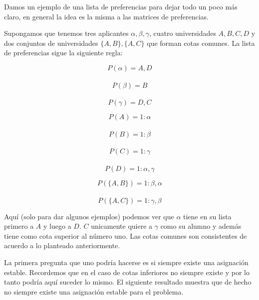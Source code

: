 Damos un ejemplo de una lista de preferencias para dejar todo un poco más claro, en general la idea es la misma a las matrices de preferencias.


\begin{eje} \cite{Todo}
\label{listprefeje}
Supongamos que tenemos tres aplicantes $\alpha,\beta, \gamma$, cuatro universidades $A,B,C,D$ y dos conjuntos de universidades $\{A,B\},\{A,C\}$ que forman cotas comunes. La lista de preferencias sigue la siguiente regla:

\noindent \begin{minipage}{.3\linewidth}
$$P(\alpha)=A,D$$ \\
$$P(\beta)=B$$ \\
$$P(\gamma)=D,C$$ 
\end{minipage}%
\begin{minipage}{.3\linewidth}
$$P(A)=1:\alpha$$ \\
$$P(B)=1:\beta$$ \\
$$P(C)=1: \gamma$$ \\
$$P(D)=1: \alpha, \gamma$$ 
\end{minipage}
\begin{minipage}{.4\linewidth}
$$P(\{A,B\})= 1:\beta,\alpha$$ \\
$$P(\{A,C\})=1:\gamma,\beta$$
\end{minipage}
Aquí (solo para dar algunos ejemplos) podemos ver que $\alpha$ tiene en su lista primero a $A$ y luego a $D$. $C$ unicamente quiere a $\gamma$ como su alumno y además tiene como cota superior al número uno. Las cotas comunes son consistentes de acuerdo a lo planteado anteriormente. 

\end{eje}

La primera pregunta que uno podría hacerse es si siempre existe una asignación estable. Recordemos que en el caso de cotas inferiores no siempre existe y por lo tanto podría aquí suceder lo mismo. El siguiente resultado muestra que de hecho no siempre existe una asignación estable para el problema.

